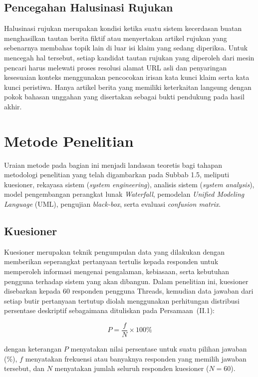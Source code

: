 \documentclass[12pt,a4paper,twoside]{report}
\begin{document}
\subsection{Pencegahan Halusinasi Rujukan}

Halusinasi rujukan merupakan kondisi ketika suatu sistem kecerdasan buatan menghasilkan tautan berita fiktif atau menyertakan artikel rujukan yang sebenarnya membahas topik lain di luar isi klaim yang sedang diperiksa. Untuk mencegah hal tersebut, setiap kandidat tautan rujukan yang diperoleh dari mesin pencari harus melewati proses resolusi alamat URL asli dan penyaringan kesesuaian konteks menggunakan pencocokan irisan kata kunci klaim serta kata kunci peristiwa. Hanya artikel berita yang memiliki keterkaitan langsung dengan pokok bahasan unggahan yang disertakan sebagai bukti pendukung pada hasil akhir.

\section{Metode Penelitian}

Uraian metode pada bagian ini menjadi landasan teoretis bagi tahapan metodologi penelitian yang telah digambarkan pada Subbab 1.5, meliputi kuesioner, rekayasa sistem (\textit{system engineering}), analisis sistem (\textit{system analysis}), model pengembangan perangkat lunak \textit{Waterfall}, pemodelan \textit{Unified Modeling Language} (UML), pengujian \textit{black-box}, serta evaluasi \textit{confusion matrix}.

\subsection{Kuesioner}

Kuesioner merupakan teknik pengumpulan data yang dilakukan dengan memberikan seperangkat pertanyaan tertulis kepada responden untuk memperoleh informasi mengenai pengalaman, kebiasaan, serta kebutuhan pengguna terhadap sistem yang akan dibangun. Dalam penelitian ini, kuesioner disebarkan kepada 60 responden pengguna Threads, kemudian data jawaban dari setiap butir pertanyaan tertutup diolah menggunakan perhitungan distribusi persentase deskriptif sebagaimana dituliskan pada Persamaan~(II.1):

\begin{equation}
  P = \frac{f}{N} \times 100\%
  \tag{II.1}
\end{equation}

dengan keterangan $P$ menyatakan nilai persentase untuk suatu pilihan jawaban (\%), $f$ menyatakan frekuensi atau banyaknya responden yang memilih jawaban tersebut, dan $N$ menyatakan jumlah seluruh responden kuesioner ($N = 60$).
\end{document}
